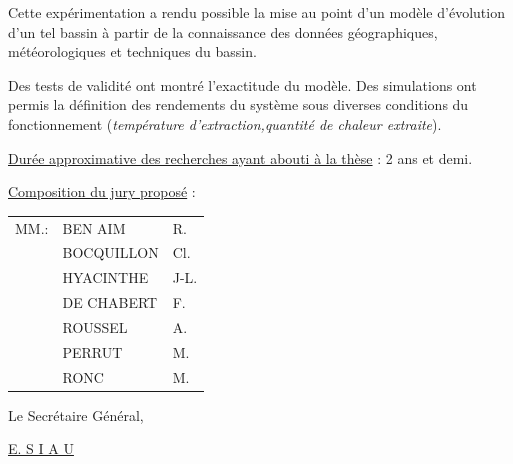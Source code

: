 Cette expérimentation a rendu possible la mise au point d'un modèle d'évolution d'un tel bassin à partir de la connaissance des données géographiques, météorologiques et techniques du bassin.

Des tests de validité ont montré l'exactitude du modèle. Des simulations ont permis la définition des rendements du système sous diverses conditions du fonctionnement (\textit{température d'extraction,quantité de chaleur extraite}).

\uline{Durée approximative des recherches ayant abouti à la thèse} : 2 ans et demi.

\uline{Composition du jury proposé} :
\begin{tabular}{lll}
MM.:& BEN AIM & R.\\
& BOCQUILLON & Cl.\\
& HYACINTHE & J-L.\\
& DE CHABERT & F.\\
& ROUSSEL & A.\\
& PERRUT & M.\\
& RONC & M.
\end{tabular}

Le Secrétaire Général,


\uline{E. S I A U}
